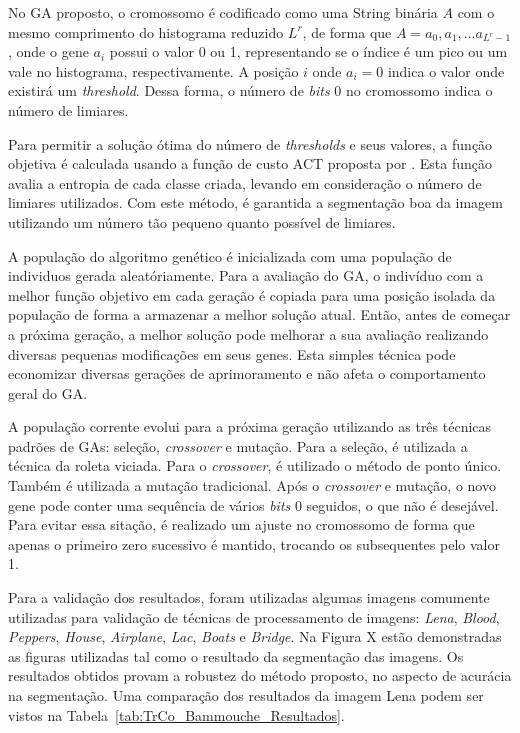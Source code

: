\documentclass[12pt,oneside,a4paper,english,french,spanish,brazil,]{abntex2}
\begin{document}
No GA proposto, o cromossomo é codificado como uma String binária \(A\) com o mesmo comprimento do histograma reduzido \(L^r\), de forma que \(A = a_0, a_1, ... a_{L^r-1}\), onde o gene \(a_i\) possui o valor 0 ou 1, representando se o índice é um pico ou um vale no histograma, respectivamente. A posição \(i\) onde \(a_i = 0\) indica o valor onde existirá um \textit{threshold}. Dessa forma, o número de \textit{bits} 0 no cromossomo indica o número de limiares.

Para permitir a solução ótima do número de \textit{thresholds} e seus valores, a função objetiva é calculada usando a função de custo ACT proposta por \citet{yen:1995}. Esta função avalia a entropia de cada classe criada, levando em consideração o número de limiares utilizados. Com este método, é garantida a segmentação boa da imagem utilizando um número tão pequeno quanto possível de limiares.

A população do algoritmo genético é inicializada com uma população de individuos gerada aleatóriamente. Para a avaliação do GA, o indivíduo com a melhor função objetivo em cada geração é copiada para uma posição isolada da população de forma a armazenar a melhor solução atual. Então, antes de começar a próxima geração, a melhor solução pode melhorar a sua avaliação realizando diversas pequenas modificações em seus genes. Esta simples técnica pode economizar diversas gerações de aprimoramento e não afeta o comportamento geral do GA.

A população corrente evolui para a próxima geração utilizando as três técnicas padrões de GAs: seleção, \textit{crossover} e mutação. Para a seleção, é utilizada a técnica da roleta viciada. Para o \textit{crossover}, é utilizado o método de ponto único. Também é utilizada a mutação tradicional. Após o \textit{crossover} e mutação, o novo gene pode conter uma sequência de vários \textit{bits} 0 seguidos, o que não é desejável. Para evitar essa sitação, é realizado um ajuste no cromossomo de forma que apenas o primeiro zero sucessivo é mantido, trocando os subsequentes pelo valor 1.

Para a validação dos resultados, foram utilizadas algumas imagens comumente utilizadas para validação de técnicas de processamento de imagens: \textit{Lena}, \textit{Blood}, \textit{Peppers}, \textit{House}, \textit{Airplane}, \textit{Lac}, \textit{Boats} e \textit{Bridge}. Na Figura X estão demonstradas as figuras utilizadas tal como o resultado da segmentação das imagens. Os resultados obtidos provam a robustez do método proposto, no aspecto de acurácia na segmentação. Uma comparação dos resultados da imagem Lena podem ser vistos na Tabela~\ref{tab:TrCo_Bammouche_Resultados}.
\end{document}
